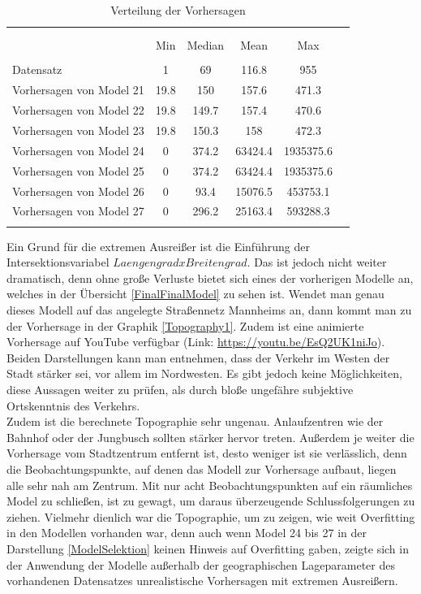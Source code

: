 \documentclass[a4paper,12pt]{thesis}
\begin{document}
\begin{table}[!htbp] \centering 
	\caption{Verteilung der Vorhersagen} 
	\label{ForecastDistribution} 
	\begin{tabular}{@{\extracolsep{-5pt}}lccccc} 
		\\[-1.8ex]\hline 
		\hline \\[-1.8ex] 
		\\[-1.8ex] & Min & Median & Mean & Max\\ 
		\hline \\[-1.8ex] 
		Datensatz & 1 & 69 & 116.8 & 955 \\ 
		Vorhersagen von Model 21	 & 19.8 & 150 & 157.6 & 471.3 \\ 
		Vorhersagen von Model 22	 & 19.8 & 149.7 & 157.4 & 470.6 \\ 
		Vorhersagen von Model 23	 & 19.8 & 150.3 & 158 & 472.3 \\ 
		Vorhersagen von Model 24	 & 0 & 374.2 & 63424.4 & 1935375.6\\ 
		Vorhersagen von Model 25	 & 0 & 374.2 & 63424.4 & 1935375.6\\ 
		Vorhersagen von Model 26	 & 0 & 93.4 & 15076.5 & 453753.1\\ 
		Vorhersagen von Model 27	 & 0 & 296.2 & 25163.4 & 593288.3\\ 
		\hline \\[-1.8ex] 
	\end{tabular} 
\end{table} 

Ein Grund für die extremen Ausreißer ist die Einführung der Intersektionsvariabel $LaengengradxBreitengrad$. Das ist jedoch nicht weiter dramatisch, denn ohne große Verluste bietet sich eines der vorherigen Modelle an, welches in der Übersicht \ref{FinalFinalModel} zu sehen ist. Wendet man genau dieses Modell auf das angelegte Straßennetz Mannheims an, dann kommt man zu der Vorhersage in der Graphik \ref{Topography1}. Zudem ist eine animierte Vorhersage auf YouTube verfügbar (Link: \url{https://youtu.be/EsQ2UK1niJo}). Beiden Darstellungen kann man entnehmen, dass der Verkehr im Westen der Stadt stärker sei, vor allem im Nordwesten. Es gibt jedoch keine Möglichkeiten, diese Aussagen weiter zu prüfen, als durch bloße ungefähre subjektive Ortskenntnis des Verkehrs.\\
Zudem ist die berechnete Topographie sehr ungenau. Anlaufzentren wie der Bahnhof oder der Jungbusch sollten stärker hervor treten. Außerdem je weiter die Vorhersage vom Stadtzentrum entfernt ist, desto weniger ist sie verlässlich, denn die Beobachtungspunkte, auf denen das Modell zur Vorhersage aufbaut, liegen alle sehr nah am Zentrum. Mit nur acht Beobachtungspunkten auf ein räumliches Model zu schließen, ist zu gewagt, um daraus überzeugende Schlussfolgerungen zu ziehen. Vielmehr dienlich war die Topographie, um zu zeigen, wie weit Overfitting in den Modellen vorhanden war, denn auch wenn Model 24 bis 27 in der Darstellung \ref{ModelSelektion} keinen Hinweis auf Overfitting gaben, zeigte sich in der Anwendung der Modelle außerhalb der geographischen Lageparameter des vorhandenen Datensatzes unrealistische Vorhersagen mit extremen Ausreißern.
\end{document}

